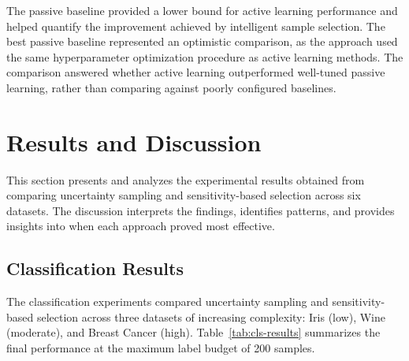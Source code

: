 \documentclass[conference]{IEEEtran}
\begin{document}
The passive baseline provided a lower bound for active learning performance and helped quantify the improvement achieved by intelligent sample selection. The best passive baseline represented an optimistic comparison, as the approach used the same hyperparameter optimization procedure as active learning methods. The comparison answered whether active learning outperformed well-tuned passive learning, rather than comparing against poorly configured baselines.

\section{Results and Discussion}

This section presents and analyzes the experimental results obtained from comparing uncertainty sampling and sensitivity-based selection across six datasets. The discussion interprets the findings, identifies patterns, and provides insights into when each approach proved most effective.

\subsection{Classification Results}

The classification experiments compared uncertainty sampling and sensitivity-based selection across three datasets of increasing complexity: Iris (low), Wine (moderate), and Breast Cancer (high). Table~\ref{tab:cls-results} summarizes the final performance at the maximum label budget of 200 samples.
\end{document}
